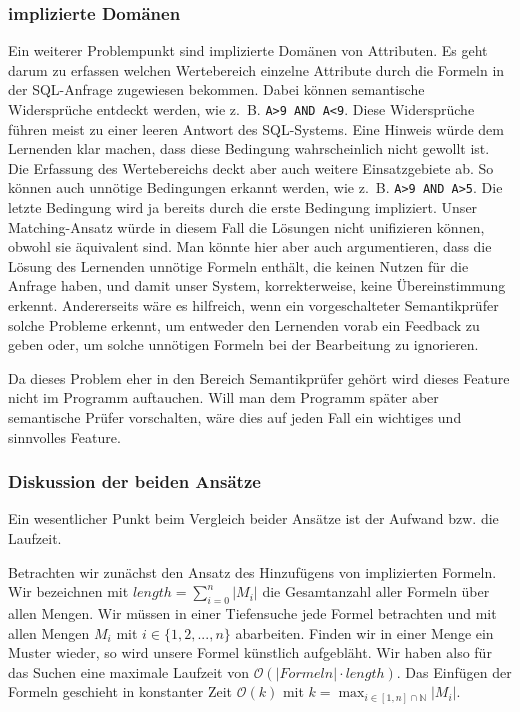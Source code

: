 \subsubsection{implizierte Domänen}

Ein weiterer Problempunkt sind implizierte Domänen von Attributen. Es geht darum zu erfassen welchen Wertebereich einzelne Attribute durch die Formeln in der SQL-Anfrage zugewiesen bekommen. Dabei können semantische Widersprüche entdeckt werden, wie \mbox{z. B.} \verb|A>9 AND A<9|. Diese Widersprüche führen meist zu einer leeren Antwort des SQL-Systems. Eine Hinweis würde dem Lernenden klar machen, dass diese Bedingung wahrscheinlich nicht gewollt ist. Die Erfassung des Wertebereichs deckt aber auch weitere Einsatzgebiete ab. So können auch unnötige Bedingungen erkannt werden, wie \mbox{z. B.} \verb|A>9 AND A>5|. Die letzte Bedingung wird ja bereits durch die erste Bedingung impliziert. Unser Matching-Ansatz würde in diesem Fall die Lösungen nicht unifizieren können, obwohl sie äquivalent sind. Man könnte hier aber auch argumentieren, dass die Lösung des Lernenden unnötige Formeln enthält, die keinen Nutzen für die Anfrage haben, und damit unser System, korrekterweise, keine Übereinstimmung erkennt. Andererseits wäre es hilfreich, wenn ein vorgeschalteter Semantikprüfer solche Probleme erkennt, um entweder den Lernenden vorab ein Feedback zu geben oder, um solche unnötigen Formeln bei der Bearbeitung zu ignorieren. 

Da dieses Problem eher in den Bereich Semantikprüfer gehört wird dieses Feature nicht im Programm auftauchen. Will man dem Programm später aber semantische Prüfer vorschalten, wäre dies auf jeden Fall ein wichtiges und sinnvolles Feature.

\subsubsection{Diskussion der beiden Ansätze}

Ein wesentlicher Punkt beim Vergleich beider Ansätze ist der Aufwand bzw. die Laufzeit. 

Betrachten wir zunächst den Ansatz des Hinzufügens von implizierten Formeln. Wir bezeichnen mit $length = \sum_{i=0}^n \vert M_i\vert$ die Gesamtanzahl aller Formeln über allen Mengen. Wir müssen in einer Tiefensuche jede Formel betrachten und mit allen Mengen $M_i$ mit $i\in \{1,2,...,n\}$ abarbeiten. Finden wir in einer Menge ein Muster wieder, so wird unsere Formel künstlich aufgebläht. Wir haben also für das Suchen eine maximale Laufzeit von $\mathcal{O}(\mathit{\vert Formeln\vert \cdot length})$. Das Einfügen der Formeln geschieht in konstanter Zeit $\mathcal{O}(k)$ mit $k= \max_{i\in [1,n]\cap \mathbb{N}} \vert M_i\vert$.

